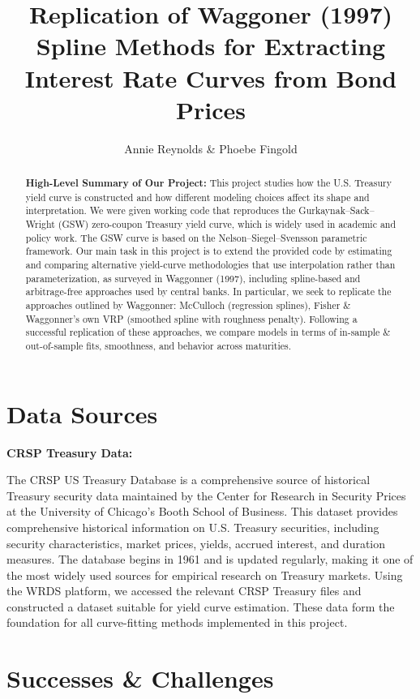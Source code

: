 \documentclass{article}
\title{Replication of Waggoner (1997) Spline Methods for Extracting Interest Rate Curves from Bond Prices}
\author{Annie Reynolds \& Phoebe Fingold}
\begin{document}
\maketitle

\begin{abstract}
\textbf{High-Level Summary of Our Project:} This project studies how the U.S. Treasury yield curve is constructed and how different modeling choices affect its shape and interpretation. We were given working code that reproduces the Gurkaynak–Sack–Wright (GSW) zero-coupon Treasury yield curve, which is widely used in academic and policy work. The GSW curve is based on the Nelson–Siegel–Svensson parametric framework. Our main task in this project is to extend the provided code by estimating and comparing alternative yield-curve methodologies that use interpolation rather than parameterization, as surveyed in Waggonner (1997), including spline-based and arbitrage-free approaches used by central banks. In particular, we seek to replicate the approaches outlined by Waggonner: McCulloch (regression splines), Fisher \& Waggonner's own VRP (smoothed spline with roughness penalty). Following a successful replication of these approaches, we compare models in terms of in-sample \& out-of-sample  fits, smoothness, and behavior across maturities.
\end{abstract}

\section{Data Sources}

\textbf{CRSP Treasury Data:}

The CRSP US Treasury Database is a comprehensive source of historical Treasury security data maintained by the Center for Research in Security Prices at the University of Chicago's Booth School of Business. This dataset provides comprehensive historical information on U.S. Treasury securities, including security characteristics, market prices, yields, accrued interest, and duration measures. The database begins in 1961 and is updated regularly, making it one of the most widely used sources for empirical research on Treasury markets. Using the WRDS platform, we accessed the relevant CRSP Treasury files and constructed a dataset suitable for yield curve estimation. These data form the foundation for all curve-fitting methods implemented in this project.

\section{Successes \& Challenges}
\end{document}
